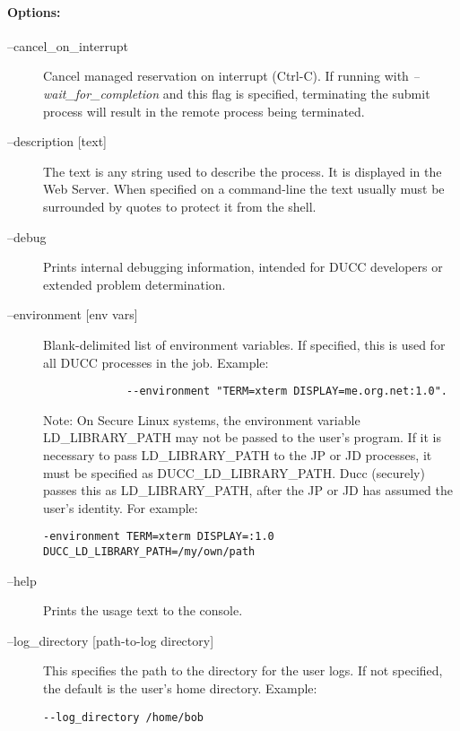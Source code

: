     \paragraph{Options:}
    \begin{description}
    
        \item[--cancel\_on\_interrupt ] Cancel managed reservation on interrupt
          (Ctrl-C).  If running with {\em--wait\_for\_completion} and this flag is specified,
          terminating the submit process will result in the remote process being terminated.

        \item[--description {[text]}] The text is any string used to describe the process. It is
          displayed in the Web Server. When specified on a command-line the text usually must be
          surrounded by quotes to protect it from the shell.

        \item[--debug ] Prints internal debugging information, intended for DUCC developers or
          extended problem determination.

        \item[--environment {[env vars]}] Blank-delimited list of environment variables. If
          specified, this is used for all DUCC processes in the job. Example:
\begin{verbatim}
             --environment "TERM=xterm DISPLAY=me.org.net:1.0". 
\end{verbatim}
          
          Note: On Secure Linux systems, the environment variable 
          LD\_LIBRARY\_PATH may not be passed to the user's program. If it is 
          necessary to pass LD\_LIBRARY\_PATH to the JP or JD processes, it must be 
          specified as DUCC\_LD\_LIBRARY\_PATH. Ducc (securely) passes this as 
          LD\_LIBRARY\_PATH, after the JP or JD has assumed the user's identity. For 
          example: 
             \begin{verbatim}
-environment TERM=xterm DISPLAY=:1.0 DUCC_LD_LIBRARY_PATH=/my/own/path
            \end{verbatim}

        \item[--help] Prints the usage text to the console.

        \item[--log\_directory {[path-to-log directory]} ]

          This specifies the path to the directory for the user logs. If not specified, the default is the 
          user's home directory. Example: 
\begin{verbatim}
--log_directory /home/bob 
\end{verbatim}
          

\end{description}

